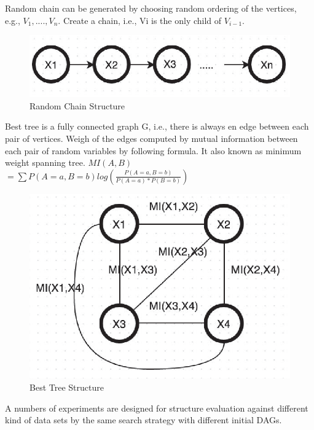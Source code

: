 \documentclass{article}
\begin{document}
Random chain can be generated by choosing random ordering of the vertices, e.g., $V_1,....,V_n$. Create a chain, i.e., Vi is the only child of $V_{i-1}$.

\begin{figure}[ht]
\vskip 0.2in
\begin{center}
\centerline{\includegraphics[width=\columnwidth]{rChain}}
\caption{Random Chain Structure}
\label{raChain}
\end{center}
\vskip -0.2in
\end{figure} 

Best tree is a fully connected graph G, i.e., there is always en edge between each pair of vertices. Weigh of the edges computed by mutual information between each pair of random variables by following formula. It also known as minimum weight spanning tree.
$MI(A,B)$
$=\sum P(A=a, B=b)log(\frac{P(A=a, B=b)}{P(A=a) * P(B=b)})$

\begin{figure}[ht]
\vskip 0.2in
\begin{center}
\centerline{\includegraphics[width=\columnwidth]{btree}}
\caption{Best Tree Structure}
\label{btree}
\end{center}
\vskip -0.2in
\end{figure} 

A numbers of experiments are designed for structure evaluation against different kind of data sets by the same search strategy with different initial DAGs.
\end{document}

